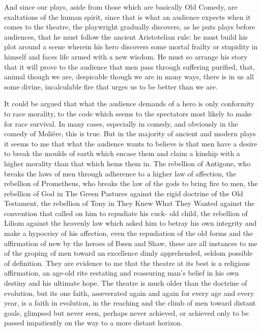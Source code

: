 \documentclass[9pt,twoside]{extarticle}
\begin{document}
And since our plays, aside from those which are basically Old Comedy, are exaltations of the human spirit, since that is what an audience expects when it comes to the theatre, the playwright gradually discovers, as he puts plays before audiences, that he must follow the ancient Aristotelian rule: he must build his plot around a scene wherein his hero discovers some mortal frailty or stupidity in himself and faces life armed with a new wisdom. He must so arrange his story that it will prove to the audience that men pass through suffering purified, that, animal though we are, despicable though we are in many ways, there is in us all some divine, incalculable fire that urges us to be better than we are.

It could be argued that what the audience demands of a hero is only conformity to race morality, to the code which seems to the spectators most likely to make for race survival. In many cases, especially in comedy, and obviously in the comedy of Moliére, this is true. But in the majority of ancient and modern plays it seems to me that what the audience wants to believe is that men have a desire to break the moulds of earth which encase them and claim a kinship with a higher morality than that which hems them in. The rebellion of Antigone, who breaks the laws of men through adherence to a higher law of affection, the rebellion of Prometheus, who breaks the law of the gods to bring fire to men, the rebellion of God in The Green Pastures against the rigid doctrine of the Old Testament, the rebellion of Tony in They Knew What They Wanted against the convention that called on him to repudiate his cuck- old child, the rebellion of Liliom against the heavenly law which asked him to betray his own integrity and make a hypocrisy of his affection, even the repudiation of the old forms and the affirmation of new by the heroes of Ibsen and Shaw, these are all instances to me of the groping of men toward an excellence dimly apprehended, seldom possible of definition. They are evidence to me that the theatre at its best is a religious affirmation, an age-old rite restating and reassuring man's belief in his own destiny and his ultimate hope. The theatre is much older than the doctrine of evolution, but its one faith, asseverated again and again for every age and every year, is a faith in evolution, in the reaching and the climb of men toward distant goals, glimpsed but never seen, perhaps never achieved, or achieved only to be passed impatiently on the way to a more distant horizon.

\newpage
\end{document}
